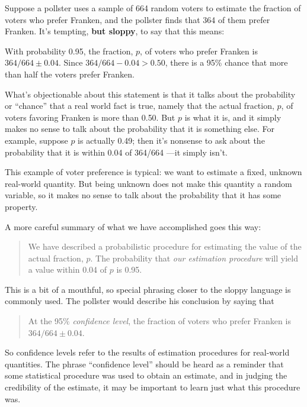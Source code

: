Suppose a pollster uses a sample of 664 random voters to estimate the
fraction of voters who prefer Franken, and the pollster finds that 364 of
them prefer Franken.  It's tempting, \textbf{but sloppy}, to say that this
means:
\begin{falseclm*}
With probability 0.95, the fraction, $p$, of voters who prefer
Franken is $364/664 \pm 0.04$.  Since $364/664 -0.04 >0.50$, there is a 95\%
chance that more than half the voters prefer Franken.
\end{falseclm*}
What's objectionable about this statement is that it talks about the
probability or ``chance'' that a real world fact is true, namely that the
actual fraction, $p$, of voters favoring Franken is more than 0.50.  But $p$
is what it is, and it simply makes no sense to talk about the probability
that it is something else.  For example, suppose $p$ is actually 0.49;
then it's nonsense to ask about the probability that it is within 0.04 of
364/664 ---it simply isn't.

This example of voter preference is typical: we want to estimate a fixed,
unknown real-world quantity.  But being unknown does not make this
quantity a random variable, so it makes no sense to talk about the
probability that it has some property.

A more careful summary of what we have accomplished goes this way:
\begin{quote}
We have described a probabilistic procedure for estimating the value of
the actual fraction, $p$.  The probability that \emph{our estimation
procedure} will yield a value within 0.04 of $p$ is 0.95.
\end{quote}
This is a bit of a mouthful, so special phrasing closer to the sloppy
language is commonly used.  The pollster would describe his conclusion by
saying that
\begin{quote}
At the 95\% \emph{confidence level}, the fraction of voters
who prefer Franken is $364/664 \pm 0.04$.
\end{quote}

So confidence levels refer to the results of estimation procedures for
real-world quantities.  The phrase ``confidence level'' should be heard as
a reminder that some statistical procedure was used to obtain an estimate,
and in judging the credibility of the estimate, it may be important to
learn just what this procedure was.

\iffalse So adding 1 to both the numerator and denominator increases the
quotient,
\footnote{
If $0 < a < b$, then
\[
\frac{a}{b} < \frac{a+1}{b+1},
\]
because
\[
\frac{a}{b} = \frac{a(1+1/b)}{b(1+1/b)} = \frac{a+a/b}{b+1} < \frac{a+1}{b+1}.
\]} and the bound~\eqref{LN12:wnsol} simplifies to $(q/p)^n/(q/p)^T
= (p/q)^{T-n}$,\fi

\endinput